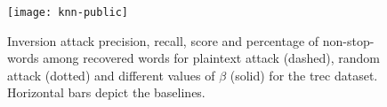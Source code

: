 \begin{figure}[h]
	\centering
	\texttt{[image: knn-public]} %
	\caption[Inversion attack accuracy metrics for different $\beta$ for \acrshort{trec} dataset]{
		Inversion attack {\color{MatplotlibOne}precision}, {\color{MatplotlibTwo}recall}, {\color{MatplotlibThree}\FOne{} score} and {\color{MatplotlibFive}percentage of non-stop-words among recovered words} for plaintext attack (dashed), random attack (dotted) and different values of $\beta$ (solid) for the \acrshort{trec} dataset.
		Horizontal bars depict the baselines.
	}\label{figure:knn-public}
\end{figure}
